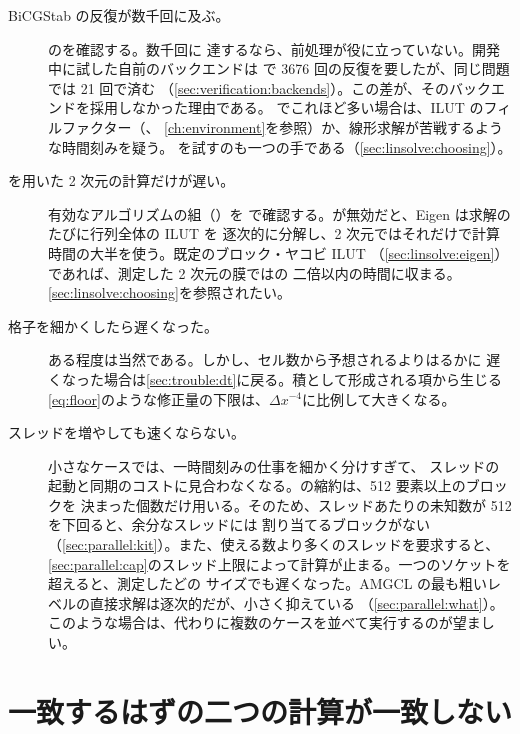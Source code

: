 \begin{description}
  \item[BiCGStab の反復が数千回に及ぶ。] のを確認する。数千回に
    達するなら、前処理が役に立っていない。開発中に試した自前のバックエンドは
    で 3676 回の反復を要したが、同じ問題では 21 回で済む
    （\cref{sec:verification:backends}）。この差が、そのバックエンドを採用しなかった理由である。
    でこれほど多い場合は、ILUT のフィルファクター（、
    \cref{ch:environment}を参照）か、線形求解が苦戦するような時間刻みを疑う。
    を試すのも一つの手である（\cref{sec:linsolve:choosing}）。
  \item[を用いた 2 次元の計算だけが遅い。] 有効なアルゴリズムの組（）を
    で確認する。が無効だと、Eigen は求解のたびに行列全体の ILUT を
    逐次的に分解し、2 次元ではそれだけで計算時間の大半を使う。既定のブロック・ヤコビ ILUT
    （\cref{sec:linsolve:eigen}）であれば、測定した 2 次元の膜ではの
    二倍以内の時間に収まる。\cref{sec:linsolve:choosing}を参照されたい。
  \item[格子を細かくしたら遅くなった。] ある程度は当然である。しかし、セル数から予想されるよりはるかに
    遅くなった場合は\cref{sec:trouble:dt}に戻る。積として形成される項から生じる
    \cref{eq:floor}のような修正量の下限は、$\Delta x^{-4}$に比例して大きくなる。
  \item[スレッドを増やしても速くならない。] 小さなケースでは、一時間刻みの仕事を細かく分けすぎて、
    スレッドの起動と同期のコストに見合わなくなる。の縮約は、512 要素以上のブロックを
    決まった個数だけ用いる。そのため、スレッドあたりの未知数が 512 を下回ると、余分なスレッドには
    割り当てるブロックがない（\cref{sec:parallel:kit}）。また、使える数より多くのスレッドを要求すると、
    \cref{sec:parallel:cap}のスレッド上限によって計算が止まる。一つのソケットを超えると、測定したどの
    サイズでも遅くなった。AMGCL の最も粗いレベルの直接求解は逐次的だが、小さく抑えている
    （\cref{sec:parallel:what}）。このような場合は、代わりに複数のケースを並べて実行するのが望ましい。
\end{description}

\section{一致するはずの二つの計算が一致しない}
\label{sec:trouble:diff}


